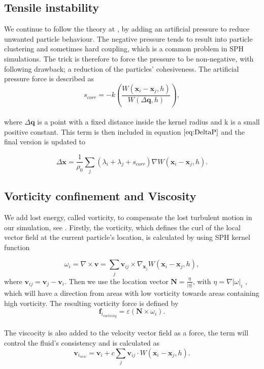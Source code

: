 \subsection{Tensile instability}
We continue to follow the theory at \cite{macklin2013position}, by adding an artificial pressure to reduce unwanted particle behaviour. The negative pressure tends to result into particle clustering and sometimes hard coupling, which is a common problem in SPH simulations. The trick is therefore to force the pressure to be non-negative, with following drawback; a reduction of the particles' cohesiveness. The artificial pressure force is described as
\\
\begin{equation}
\label{eq:Scorr}
s_{corr} = -k \left( \frac{W(\mathbf{x}_i - \mathbf{x}_j, h)}{W(\Delta \mathbf{q}, h)} \right),
\end{equation}
\\
where $\Delta \mathbf{q}$ is a point with a fixed distance inside the kernel radius and k is a small positive constant. This term is then included in equation $\ref{eq:DeltaP}$ and the final version is updated to

\begin{equation}
\label{eq:DeltaPscorr}
\Delta \mathbf{x} = \frac{1}{\rho_0} \sum\limits_{j} (\lambda_i + \lambda_j + s_{corr}) \nabla W(\mathbf{x}_i - \mathbf{x}_j, h).
\end{equation}

\subsection{Vorticity confinement and Viscosity}
We add lost energy, called vorticity, to compensate the lost turbulent motion in our simulation, see \cite{macklin2013position}.
Firstly, the vorticity, which defines the curl of the local vector field at the current particle's location, is calculated by using SPH kernel function

\begin{equation}
\label{eq:Omega}
\omega_{i} = \nabla \times \mathbf{v} =  \sum\limits_{j} \mathbf{v}_{ij} \times \nabla_{\mathbf{x}_{j}} W(\mathbf{x}_{i} - \mathbf{x}_{j}, h),
\end{equation}
where $\mathbf{v}_{ij} = \mathbf{v}_{j} - \mathbf{v}_{i}$. Then we use the location vector $\mathbf{N} = \frac{\eta}{|\eta|}$, with $\eta = \nabla|\omega|_{i}$
, which will have a direction from areas with low vorticity towards areas containing high vorticity. The resulting vorticity force is defined by
\\
\begin{equation}
\label{eq:Vorticity}
\mathbf{f}_{i_{vorticity}} = \varepsilon \left(\mathbf{N} \times \omega_{i} \right).
\end{equation}
\\
The viscocity is also added to the velocity vector field as a force, the term will control the fluid's consistency and is calculated as
\begin{equation}
\label{eq:Viscosity}
\mathbf{v}_{i_{new}} = \mathbf{v}_{i} + c \sum\limits_{j} \mathbf{v}_{ij} \cdot W(\mathbf{x}_i - \mathbf{x}_j, h).
\end{equation}

